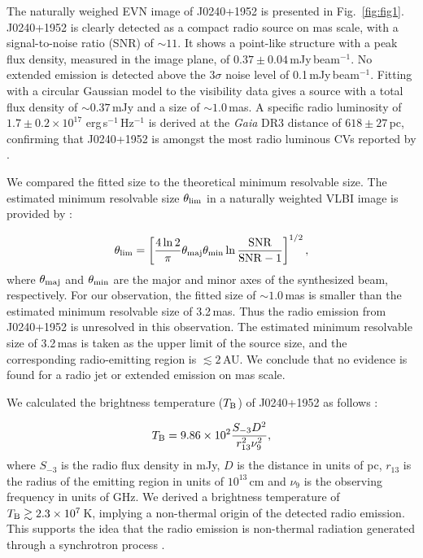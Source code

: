 \documentclass[fleqn,usenatbib]{mnras}
\begin{document}
The naturally weighed EVN image of J0240+1952 is presented in Fig.~\ref{fig:fig1}. 
J0240+1952 is clearly detected as a compact radio source on mas scale, with a signal-to-noise ratio (SNR) of $\sim11$. It shows a point-like structure with a peak flux density, measured in the image plane, of $0.37\pm0.04$\,mJy\,beam$^{-1}$. No extended emission is detected above the 3$\sigma$ noise level of 0.1\,mJy\,beam$^{-1}$. Fitting with a circular Gaussian model to the visibility data gives a source with a total flux density of $\sim0.37$\,mJy and a size of $\sim1.0$\,mas. A specific radio luminosity of $1.7\pm0.2\times10^{17}$ erg\,s$^{-1}$\,Hz$^{-1}$ is derived at the \textit{Gaia} DR3 \citep{Gaia2023} distance of $618\pm27$\,pc, confirming that J0240+1952 is amongst the most radio luminous CVs reported by \citet{Pretorius2021}.

We compared the fitted size to the theoretical minimum resolvable size. The estimated minimum resolvable size $\theta_{\rm lim}$ in a naturally weighted VLBI image is provided by \citet{Lobanov2005}:

\begin{equation}
    \theta_{\rm lim}=\left[ \frac{4\ln{2}}{\pi}\theta_{\rm maj}\theta_{\rm min}\ln{\frac{\rm SNR}{\rm SNR-1}}\right]^{1/2},
    \label{eq:eq1}
\end{equation}
where $\theta_{\rm maj}$ and $\theta_{\rm min}$ are the major and minor axes of the synthesized beam, respectively. For our observation, the fitted size of $\sim1.0$\,mas is smaller than the estimated minimum resolvable size of 3.2\,mas. Thus the radio emission from J0240+1952 is unresolved in this observation. The estimated minimum resolvable size of 3.2\,mas is taken as the upper limit of the source size, and the corresponding radio-emitting region is $\lesssim2$\,AU. We conclude that no evidence is found for a radio jet or extended emission on mas scale.

We calculated the brightness temperature ($T_{\rm B}$) of J0240+1952 as follows \citep[e.g.][]{Bastian1988}: 

\begin{equation}
    T_{\rm B}=9.86\times10^{2}\frac{S_{-3}D^{2}}{r^{2}_{13}\nu^{2}_{9}},
    \label{eq:eq2}
\end{equation}
where $S_{-3}$ is the radio flux density in mJy, $D$ is the distance in units of pc, $r_{13}$ is the radius of the emitting region in units of $10^{13}$\,cm and $\nu_{9}$ is the observing frequency in units of GHz. We derived a brightness temperature of $T_{\rm B}\gtrsim2.3\times10^{7}$\,K, implying a non-thermal origin of the detected radio emission. This supports the idea that the radio emission is non-thermal radiation generated through a synchrotron process \citep[e.g.][]{Bastian1988,Kuijpers1997,Meintjes2003}.
\end{document}
